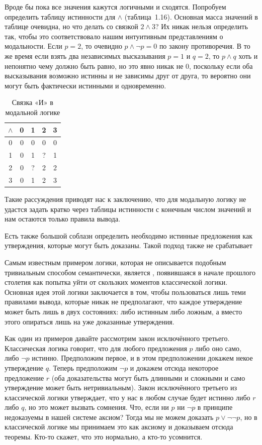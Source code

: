 Вроде бы пока все значения кажутся логичными и сходятся. Попробуем определить таблицу истинности для $\land$ (таблица~1.16). Основная масса значений в таблице очевидна, но что делать со связкой $2\land 3$?  Их никак нельзя определить так, чтобы это соответствовало нашим интуитивным представлениям о модальности. Если $p=2$, то очевидно $p\land\neg p = 0$ по закону противоречия. В то же время если взять два независимых высказывания $p=1$ и $q=2$, то $p\land q$ хоть и непонятно чему должно быть равно, но это явно никак не 0, поскольку если оба высказывания возможно истинны и не зависимы друг от друга, то вероятно они могут быть фактически истинными и одновременно.

\begin{table}[h]
\centering
\begin{tabular}{c | c c c c}
$\land$ & 0 &1 &2 & 3 \\
\hline
0 & 0 & 0 & 0 & 0\\
1 & 0 & 1 & ? & 1\\
2 & 0 & ? & 2 & 2\\
3 & 0 & 1 & 2 & 3
\end{tabular}
\caption{Связка «И» в модальной логике}\label{table:kleene-or}
\end{table}

Такие рассуждения приводят нас к заключению, что для модальную логику не удастся задать кратко через таблицы истинности с конечным числом значений и нам остаются только правила вывода.

Есть также большой соблазн определить необходимо истинные предложения как утверждения, которые могут быть доказаны. Такой подход также не срабатывает 


Самым известным примером логики, которая не описывается подобным тривиальным способом семантически, является , появившаяся в начале прошлого столетия как попытка уйти от скользких моментов классической логики. Основная идея этой логики заключается в том, чтобы пользоваться лишь теми правилами вывода, которые никак не предполагают, что каждое утверждение может быть лишь в двух состояниях: либо истинным либо ложным, а вместо этого опираться лишь на уже доказанные утверждения.

Как один из примеров давайте рассмотрим закон исключённого третьего. Классическая логика говорит, что для любого предложения $p$ либо оно само, либо $\neg p$ истинно. Предположим первое, и в этом предположении докажем некое утверждение $q$. Теперь предположим $\neg p$ и докажем отсюда некоторое предложение $r$ (оба доказательства могут быть длинными и сложными и само утверждение может быть нетривиальным). Закон исключённого третьего из классической логики утверждает, что у нас в любом случае будет истинно либо $r$ либо $q$, но это может вызвать сомнения. Что, если ни $p$ ни $\neg p$ в принципе недоказуемы в нашей системе аксиом? Тогда мы не можем доказать $p \lor \neg \neg p$, но в классической логике мы принимаем это как аксиому и доказываем отсюда теоремы. Кто-то скажет, что это нормально, а кто-то усомнится.

